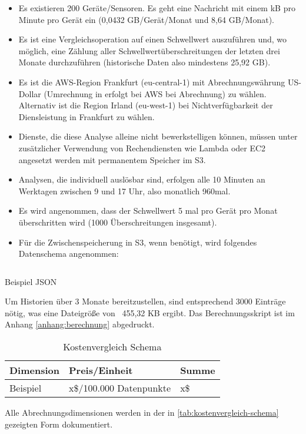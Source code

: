 \begin{itemize}
\item Es existieren 200 Geräte/Sensoren. Es geht eine Nachricht mit einem kB pro Minute pro Gerät ein (0,0432 GB/Gerät/Monat und 8,64 GB/Monat).
\item Es ist eine Vergleichsoperation auf einen Schwellwert auszuführen und, wo möglich, eine Zählung aller Schwellwertüberschreitungen der letzten drei Monate durchzuführen (historische Daten also mindestens 25,92 GB).  
\item Es ist die \ac{AWS}-Region Frankfurt (eu-central-1) mit Abrechnungswährung US-Dollar (Umrechnung in \texteuro{} erfolgt bei \ac{AWS} bei Abrechnung) zu wählen. Alternativ ist die Region Irland (eu-west-1) bei Nichtverfügbarkeit der Diensleistung in Frankfurt zu wählen. 
\item Dienste, die diese Analyse alleine nicht bewerkstelligen können, müssen unter zusätzlicher Verwendung von Rechendiensten wie Lambda oder \ac{EC2} angesetzt werden mit permanentem Speicher im \ac{S3}. 
\item Analysen, die individuell auslösbar sind, erfolgen alle 10 Minuten an Werktagen zwischen 9 und 17 Uhr, also monatlich 960mal. 
\item Es wird angenommen, dass der Schwellwert 5 mal pro Gerät pro Monat überschritten wird (1000 Überschreitungen insgesamt).
\item Für die Zwischenspeicherung in \ac{S3}, wenn benötigt, wird folgendes Datenschema angenommen:
\end{itemize}

\begin{listing}[H]
\inputminted[frame=lines,breaklines=true]{json}{code/estimates/filtered-estimate.json}
\caption[Beispiel JSON]{Beispiel \ac{JSON}}
\label{listing:json}
\end{listing}
Um Historien über 3 Monate bereitzustellen, sind entsprechend 3000 Einträge nötig, was eine Dateigröße von ~455,32 KB ergibt. Das Berechnungsskript ist im Anhang \ref{anhang:berechnung} abgedruckt.


\begin{table}[H]
\centering
\begin{tabular}{|l|l|l|}
\hline
Dimension & Preis/Einheit           & Summe \\ \hline
Beispiel  & x\$/100.000 Datenpunkte & x\$  \\\hline
\end{tabular}
\caption{Kostenvergleich Schema}
\label{tab:kostenvergleich-schema}
\end{table}
Alle Abrechnungsdimensionen werden in der in \autoref{tab:kostenvergleich-schema} gezeigten Form dokumentiert.
